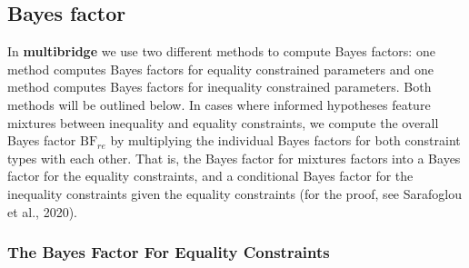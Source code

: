 \documentclass[
  english,
  man,floatsintext]{apa6}
\begin{document}
\hypertarget{bayes-factor}{%
\subsection{Bayes factor}\label{bayes-factor}}

\noindent In \textbf{multibridge} we use two different methods to compute Bayes factors: one method computes Bayes factors for equality constrained parameters and one method computes Bayes factors for inequality constrained parameters. Both methods will be outlined below. In cases where informed hypotheses feature mixtures between inequality and equality constraints, we compute the overall Bayes factor \(\text{BF}_{re}\) by multiplying the individual Bayes factors for both constraint types with each other. That is, the Bayes factor for mixtures factors into a Bayes factor for the equality constraints, and a conditional Bayes factor for the inequality constraints given the equality constraints (for the proof, see Sarafoglou et al., 2020).

\hypertarget{the-bayes-factor-for-equality-constraints}{%
\subsubsection{The Bayes Factor For Equality Constraints}\label{the-bayes-factor-for-equality-constraints}}
\end{document}
